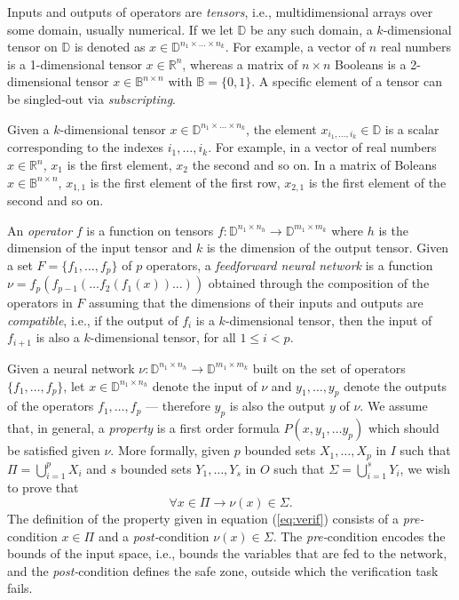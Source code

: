 Inputs and outputs of operators are \emph{tensors}, i.e.,
multidimensional arrays over some domain, usually numerical. 
If we let $\mathbb{D}$ be any such domain, a $k$-dimensional 
tensor on $\mathbb{D}$ is denoted as $x \in \mathbb{D}^{n_1 
	\times \ldots \times n_k}$.
For example, a vector of $n$ real numbers is a 1-dimensional
tensor $x \in \mathbb{R}^n$, whereas a matrix of $n \times n$ 
Booleans is a 2-dimensional tensor $x \in \mathbb{B}^{n 
	\times n}$ with $\mathbb{B} = \{0, 1\}$. A specific element 
of a tensor can be singled-out via \emph{subscripting}. 

Given a $k$-dimensional tensor $x \in \mathbb{D}^{n_1 \times 
	\ldots \times n_k}$, the element $x_{i_1, \ldots, i_k} \in 
	\mathbb{D}$ is a scalar corresponding to the indexes 
${i_1, \ldots, i_k}$. For example, in a vector of real numbers 
$x \in \mathbb{R}^n$, $x_1$ is the first element, $x_2$ the second 
and so on. In a matrix of Boleans $x \in \mathbb{B}^{n \times
  n}$, $x_{1,1}$ is the first element of the first row, $x_{2,1}$ 
is the first element of the second and so on.

An \emph{operator} $f$ is a function on tensors 
$f: \mathbb{D}^{n_{1} \times n_h} \to \mathbb{D}^{m_{1} \times m_k}$
where $h$ is the dimension of the input tensor and $k$ is the 
dimension of the output tensor. Given a set $F = \{f_1, \ldots, 
	f_p\}$ of $p$ operators, a \emph{feedforward neural network}
is a function $\nu = f_p(f_{p-1}(\ldots f_2(f_1(x))\ldots))$ obtained
through the composition of the operators in $F$ assuming that the 
dimensions of their inputs and outputs are \emph{compatible}, i.e.,
if the  output of $f_i$ is a $k$-dimensional tensor, then the input
of $f_{i+1}$ is also a $k$-dimensional tensor, for all $1 \leq i < p$.

Given a neural network $\nu : \mathbb{D}^{n_{1} \times n_h} \to
\mathbb{D}^{m_{1} \times m_k}$ built on the set of operators $\{f_1,
\ldots, f_p\}$, let $x \in \mathbb{D}^{n_{1} \times n_h}$ denote
the input of $\nu$ and $y_1, \ldots, y_p$ denote the outputs of the
operators $f_1, \ldots, f_p$ --- therefore $y_p$ is also the output
$y$ of $\nu$. We assume that, in general, a \emph{property} is a first
order formula $P(x, y_1, \ldots y_p)$ which should be satisfied given 
$\nu$. More formally, given $p$ bounded sets $X_1, \ldots, X_p$ in $I$ 
such that $\Pi = \bigcup_{i=1}^p X_i$ and $s$ bounded sets $Y_1, 
\ldots, Y_s$ in $O$ such that $\Sigma = \bigcup_{i=1}^s Y_i$, we wish
to prove that  
\begin{equation}
	\label{eq:verif}
	\forall x \in \Pi \rightarrow \nu(x) \in \Sigma.
\end{equation}
The definition of the property given in equation (\ref{eq:verif})
consists of a \textit{pre-}condition $x \in \Pi$ and a 
\textit{post-}condition $\nu(x) \in \Sigma$. The 
\textit{pre-}condition encodes the bounds of the input space, i.e.,
bounds the variables that are fed to the network, and the 
\textit{post-}condition defines the safe zone, outside which the 
verification task fails.

